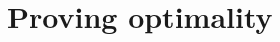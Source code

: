 \documentclass[thesis.tex]{subfiles}
\begin{document}
\chapter{Proving optimality}
\label{sec:proof}
\end{document}
